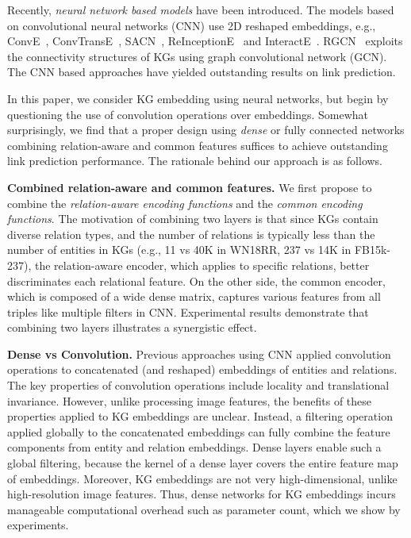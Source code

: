 Recently, \textit{neural network based models} have been introduced. The models based on convolutional neural networks (CNN) use 2D reshaped embeddings, e.g., ConvE~\cite{dettmers2018convolutional},  ConvTransE~\cite{shang2019end}, SACN~\cite{shang2019end}, ReInceptionE~\cite{xie2020reinceptione} and InteractE~\cite{vashishth2020interacte}. RGCN~\cite{schlichtkrull2018modeling} exploits the connectivity structures of KGs using graph convolutional network (GCN). The CNN based approaches have yielded outstanding results on link prediction.

In this paper, we consider KG embedding using neural networks, but begin by questioning the use of convolution operations over embeddings. Somewhat surprisingly, we find that a proper design using \emph{dense} or fully connected networks combining relation-aware and common features suffices to achieve outstanding link prediction performance. The rationale behind our approach is as follows.

\textbf{Combined relation-aware and common features.} We first propose to combine the \emph{relation-aware encoding functions} and the \emph{common encoding functions}. The motivation of combining two layers is that since KGs contain diverse relation types, and the number of relations is typically less than the number of entities in KGs (e.g., 11 vs 40K in WN18RR, 237 vs 14K in FB15k-237), the relation-aware encoder, which applies to specific relations, better discriminates each relational feature. On the other side, the common encoder, which is composed of a wide dense matrix, captures various features from all triples like multiple filters in CNN. Experimental results demonstrate that combining two layers illustrates a synergistic effect.

\textbf{Dense vs Convolution.} Previous approaches using CNN applied convolution operations to concatenated (and reshaped) embeddings of entities and relations. The key properties of convolution operations include locality and translational invariance. However, unlike processing image features, the benefits of these properties applied to KG embeddings are unclear. Instead, a filtering operation applied globally to the concatenated embeddings can fully combine the feature components from entity and relation embeddings. Dense layers enable such a global filtering, because the kernel of a dense layer covers the entire feature map of embeddings. Moreover, KG embeddings are not very high-dimensional, unlike high-resolution image features. Thus, dense networks for KG embeddings incurs manageable computational overhead such as parameter count, which we show by experiments.

